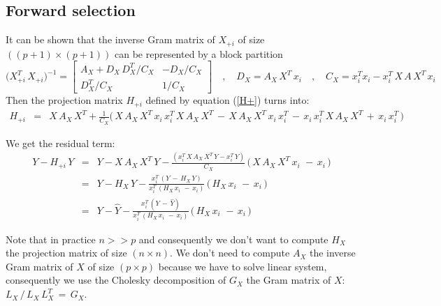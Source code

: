 \subsection{Forward selection}

It can be shown that the inverse Gram matrix of $X_{+i}$ of size $((p+1)\times(p+1))$  can be represented by a block partition
\begin{equation}
\big(X^T_{+i} \,X_{+i}\big)^{-1} =
 \begin{bmatrix}
A_X + D_X\,D_X^T/C_X  & -D_X/C_X \\
D_X^T/C_X & 1/C_X
\end{bmatrix}
 \quad,\quad D_X = A_X\, X^T\,x_i
 \quad,\quad C_X = x_i^T x_i -x_i^T \,X\,A \, X^T\, x_i
 \end{equation}
Then the projection matrix $H_{+i}$ defined by equation (\ref{H+}) turns into:
 \begin{eqnarray}
H_{+i} & = &X\,A_X \, X^T + \frac{1}{C_X} \big(\,X\,A_X \, X^T\,x_i\,x_i^T\,X\,A_X \, X^T \,-\,X\,A_X \, X^T\,x_i\,x_i^T \,-\,x_i\,x_i^T \, X\,A_X \, X^T\,+\,x_i\,x_i^T \,\big)
\end{eqnarray}

We get the residual term:
 \begin{eqnarray}
Y-H_{+i}\,Y  & = & Y-X\,A_X \, X^T\,Y -\frac{(x_i^T\,X\,A_X \, X^T\,Y-x_i^T\,Y)}{C_X}\, \big(\,X\,A_X \, X^T\,x_i\, \,-\,x_i\,\big)\\
 & = & Y - H_X\,Y -\frac{x_i^T\,(Y\,-\,H_X\,Y)}{x_i^T\,(H_X\,x_i\, \,-\,x_i)}\, \big(\,H_X\,x_i\, \,-\,x_i\,\big)\\
\label{defH+Y}
 & = & Y - \hat{Y} -\frac{x_i^T\,(Y\,-\,\hat{Y})}{x_i^T\,(H_X\,x_i\, \,-\,x_i)}\, \big(\,H_X\,x_i\, \,-\,x_i\,\big)
\end{eqnarray}

Note that in practice $n >> p$ and consequently we don't want to compute $H_X$ the projection matrix of size $(n\times n)$.
We don't need to compute $A_X$ the inverse Gram matrix of $X$ of size $(p\times p)$ because we have to solve linear system, consequently
we use the Cholesky decomposition of $G_X$ the Gram matrix of $X$: $L_X  \,/\, L_X\,L_X^T\,=\,G_X$.

